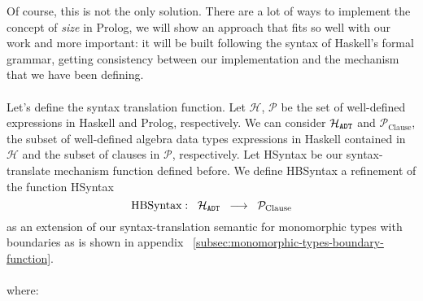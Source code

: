 Of course, this is not the only solution. There are a lot of ways to implement the concept of \textit{size} in Prolog, we will show an approach that fits so well with our work and more important: it will be built following the syntax of Haskell's formal grammar, getting consistency between our implementation and the mechanism that we have been defining.\\\\
Let's define the syntax translation function. Let $\mathcal{H}$, $\mathcal{P}$ be the set of well-defined expressions in Haskell and Prolog, respectively. We can consider $\mathcal{H}_{\texttt{ADT}}$ and $\mathcal{P}_{\text{Clause}}$, the subset of well-defined algebra data types expressions in Haskell contained in $\mathcal{H}$ and the subset of clauses in $\mathcal{P}$, respectively. Let HSyntax be our syntax-translate mechanism function defined before. We define HBSyntax a refinement of the function HSyntax $$\text{HBSyntax} :\;\; \mathcal{H}_{\texttt{ADT}} \;\; \longrightarrow \;\; \mathcal{P}_{\text{Clause}}$$ as an extension of our syntax-translation semantic for monomorphic types with boundaries as is shown in appendix ~\ref{subsec:monomorphic-types-boundary-function}.\\\\
where:
